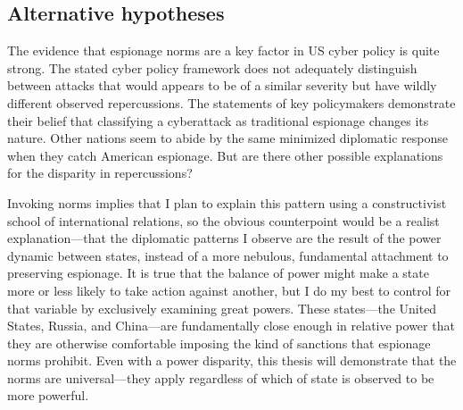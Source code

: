 \documentclass[11pt]{memoir}
\begin{document}
\begin{refsegment}


\subsection{Alternative hypotheses}
The evidence that espionage norms are a key factor in US cyber policy is quite strong. The stated cyber policy framework does not adequately distinguish between attacks that would appears to be of a similar severity but have wildly different observed repercussions. The statements of key policymakers demonstrate their belief that classifying a cyberattack as traditional espionage changes its nature. Other nations seem to abide by the same minimized diplomatic response when they catch American espionage. But are there other possible explanations for the disparity in repercussions?

Invoking norms implies that I plan to explain this pattern using a constructivist school of international relations, so the obvious counterpoint would be a realist explanation---that the diplomatic patterns I observe are the result of the power dynamic between states, instead of a more nebulous, fundamental attachment to preserving espionage. It is true that the balance of power might make a state more or less likely to take action against another, but I do my best to control for that variable by exclusively examining great powers. These states---the United States, Russia, and China---are fundamentally close enough in relative power that they are otherwise comfortable imposing the kind of sanctions that espionage norms prohibit. Even with a power disparity, this thesis will demonstrate that the norms are universal---they apply regardless of which of state is observed to be more powerful.


\end{refsegment}
\end{document}
